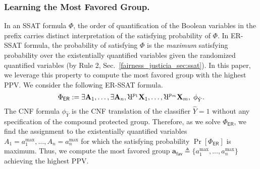 \subsubsection{Learning the Most Favored Group.}
In an SSAT formula $ \Phi $, the order of quantification of the Boolean variables in the prefix  carries distinct interpretation of the satisfying probability of $ \Phi $.  
In ER-SSAT formula, the probability of satisfying $ \Phi $ is the \textit{maximum} satisfying probability over the existentially quantified variables given the randomized quantified variables (by Rule 2, Sec.~\ref{fairness_justicia_sec:ssat}). 
In this paper, we leverage this property to compute the most favored group with the highest PPV. 
We consider the following ER-SSAT formula. 
\begin{equation}
\Phi_{\mathsf{ER}} := \exists \sensitive_1,\dots, \exists \sensitive_n,
 \R^{p_{1}}\nonsensitive_1, \dots, \R^{p_{m}}\nonsensitive_m,   \; \phi_{\hat{Y}}.
 \label{fairness_justicia_eq:er}
\end{equation}
The CNF formula $\phi_{\hat{Y}}$ is the CNF translation  of the classifier $ \hat{Y} = 1 $ without any specification of the compound protected group.  Therefore, as we solve $ \Phi_{\mathsf{ER}} $, we find the assignment to the existentially quantified variables $ A_1 = a^{\max}_1, \dots,A_n = a^{\max}_n $ for which the satisfying probability $ \Pr[\Phi_{\mathsf{ER}}] $ is maximum. 
Thus, we compute  the most favored group $ \mathbf{a}_{\mathsf{fav}} \triangleq \{ a^{\max}_1, \dots, a^{\max}_n \}$ achieving the highest PPV. 


